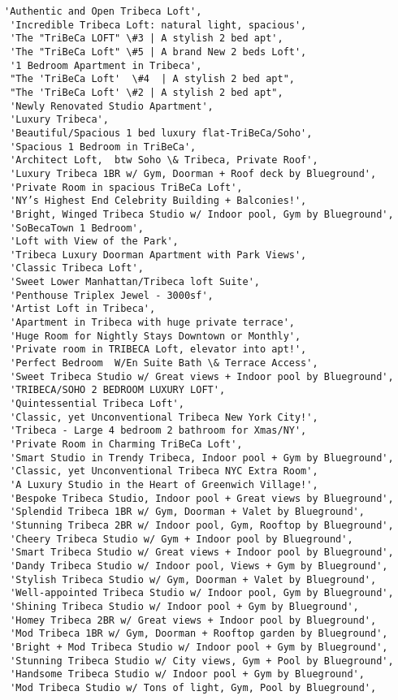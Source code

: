 \documentclass[11pt]{article}
\begin{document}
\begin{tcolorbox}[breakable, size=fbox, boxrule=.5pt, pad at break*=1mm, opacityfill=0]
\begin{Verbatim}[commandchars=\\\{\}]
 'Authentic and Open Tribeca Loft',
 'Incredible Tribeca Loft: natural light, spacious',
 'The "TriBeCa LOFT" \#3 | A stylish 2 bed apt',
 'The "TriBeCa Loft" \#5 | A brand New 2 beds Loft',
 '1 Bedroom Apartment in Tribeca',
 "The 'TriBeCa Loft'  \#4  | A stylish 2 bed apt",
 "The 'TriBeCa Loft' \#2 | A stylish 2 bed apt",
 'Newly Renovated Studio Apartment',
 'Luxury Tribeca',
 'Beautiful/Spacious 1 bed luxury flat-TriBeCa/Soho',
 'Spacious 1 Bedroom in TriBeCa',
 'Architect Loft,  btw Soho \& Tribeca, Private Roof',
 'Luxury Tribeca 1BR w/ Gym, Doorman + Roof deck by Blueground',
 'Private Room in spacious TriBeCa Loft',
 'NY’s Highest End Celebrity Building + Balconies!',
 'Bright, Winged Tribeca Studio w/ Indoor pool, Gym by Blueground',
 'SoBecaTown 1 Bedroom',
 'Loft with View of the Park',
 'Tribeca Luxury Doorman Apartment with Park Views',
 'Classic Tribeca Loft',
 'Sweet Lower Manhattan/Tribeca loft Suite',
 'Penthouse Triplex Jewel - 3000sf',
 'Artist Loft in Tribeca',
 'Apartment in Tribeca with huge private terrace',
 'Huge Room for Nightly Stays Downtown or Monthly',
 'Private room in TRIBECA Loft, elevator into apt!',
 'Perfect Bedroom  W/En Suite Bath \& Terrace Access',
 'Sweet Tribeca Studio w/ Great views + Indoor pool by Blueground',
 'TRIBECA/SOHO 2 BEDROOM LUXURY LOFT',
 'Quintessential Tribeca Loft',
 'Classic, yet Unconventional Tribeca New York City!',
 'Tribeca - Large 4 bedroom 2 bathroom for Xmas/NY',
 'Private Room in Charming TriBeCa Loft',
 'Smart Studio in Trendy Tribeca, Indoor pool + Gym by Blueground',
 'Classic, yet Unconventional Tribeca NYC Extra Room',
 'A Luxury Studio in the Heart of Greenwich Village!',
 'Bespoke Tribeca Studio, Indoor pool + Great views by Blueground',
 'Splendid Tribeca 1BR w/ Gym, Doorman + Valet by Blueground',
 'Stunning Tribeca 2BR w/ Indoor pool, Gym, Rooftop by Blueground',
 'Cheery Tribeca Studio w/ Gym + Indoor pool by Blueground',
 'Smart Tribeca Studio w/ Great views + Indoor pool by Blueground',
 'Dandy Tribeca Studio w/ Indoor pool, Views + Gym by Blueground',
 'Stylish Tribeca Studio w/ Gym, Doorman + Valet by Blueground',
 'Well-appointed Tribeca Studio w/ Indoor pool, Gym by Blueground',
 'Shining Tribeca Studio w/ Indoor pool + Gym by Blueground',
 'Homey Tribeca 2BR w/ Great views + Indoor pool by Blueground',
 'Mod Tribeca 1BR w/ Gym, Doorman + Rooftop garden by Blueground',
 'Bright + Mod Tribeca Studio w/ Indoor pool + Gym by Blueground',
 'Stunning Tribeca Studio w/ City views, Gym + Pool by Blueground',
 'Handsome Tribeca Studio w/ Indoor pool + Gym by Blueground',
 'Mod Tribeca Studio w/ Tons of light, Gym, Pool by Blueground',

\end{Verbatim}
\end{tcolorbox}
\end{document}
